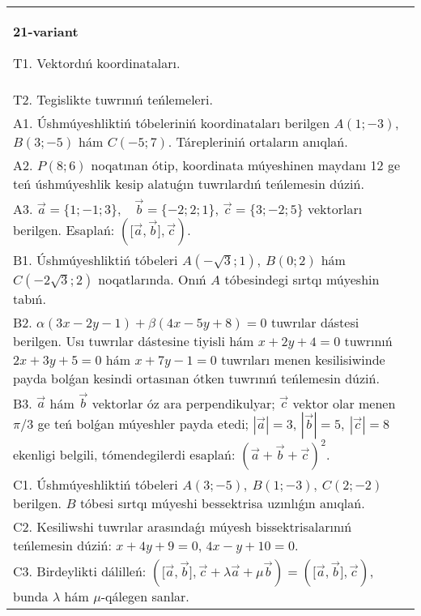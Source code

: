 \documentclass{article}
\begin{document}
\begin{tabular}{m{17cm}}
\textbf{21-variant}
\newline

T1. 
Vektordıń koordinataları.
 \\
T2. 
Tegislikte tuwrınıń teńlemeleri.
 \\
A1. 
Úshmúyeshliktiń tóbeleriniń koordinataları berilgen
$A(1;-3)$, $B(3;-5)$ hám $C(-5;7)$. Tárepleriniń ortaların
anıqlań.
 \\
A2. 
$P(8;6)$ noqatınan ótip, koordinata múyeshinen 
maydanı 12 ge teń úshmúyeshlik kesip alatuǵın tuwrılardıń teńlemesin 
dúziń.
 \\
A3. 
$\overrightarrow{a}
= \{ 1; - 1;3\}, \ \ \ \ \overrightarrow{b} = \{ - 2;2;1\}$, $\overrightarrow{c} = \{3; -2;5\}$ vektorları berilgen. Esaplań: 
$(\lbrack\overrightarrow{a},\overrightarrow{b}\rbrack,\overrightarrow{c})$.
 \\
B1. 
Úshmúyeshliktiń tóbeleri
\(A\left(-\sqrt{3};1 \right),\ B(0;2)\) hám
\(C\left(-2\sqrt{3};2 \right)\) noqatlarında. Onıń $A$
tóbesindegi sırtqı múyeshin tabıń.
 \\
B2. 
\(\alpha(3x-2y-1)+\beta(4x-5y+8)=0\) tuwrılar
dástesi berilgen. Usı tuwrılar dástesine tiyisli hám \(x+2y+4=0\)
tuwrınıń \(2x+3y+5=0\) hám \(x+7y-1=0\) tuwrıları menen
kesilisiwinde payda bolǵan kesindi ortasınan ótken tuwrınıń teńlemesin
dúziń.
 \\
B3. 
$\vec{a}$ hám $\vec{b}$ vektorlar óz ara perpendikulyar; $\vec{c}$ vektor olar menen $\pi/3$ ge teń bolǵan múyeshler payda etedi; $|\vec{a}| = 3$, $|\vec{b}| = 5,\ |\vec{c}| = 8$ ekenligi belgili, tómendegilerdi esaplań: 
$(\vec{a} + \vec{b} + \vec{c}) ^{2}$.
 \\
C1. 
Úshmúyeshliktiń tóbeleri
\(A(3; - 5),\ B(1; - 3),\ C(2; - 2)\) berilgen. $B$ tóbesi sırtqı
múyeshi bessektrisa uzınlıǵın anıqlań.
 \\
C2. 
Kesiliwshi tuwrılar arasındaǵı múyesh bissektrisalarınıń
teńlemesin dúziń: $x + 4y + 9 = 0$, $4x - y + 10 = 0$.
 \\
C3. 
Birdeylikti dálilleń: \((\lbrack\vec{a},\vec{b}\rbrack,\vec{c} + \lambda\vec{a} + \mu\vec{b}) = (\lbrack\vec{a},\vec{b}\rbrack,\vec{c})\), bunda \(\lambda\) hám \(\mu\)-qálegen sanlar.
 \\

\end{tabular}
\vspace{1cm}
\end{document}
